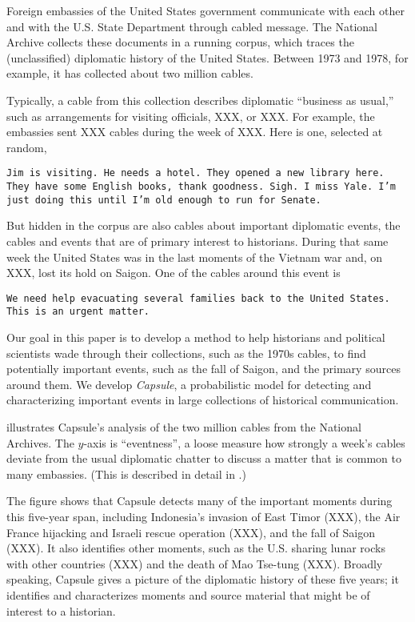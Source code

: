 

Foreign embassies of the United States government communicate with
each other and with the U.S. State Department through cabled message.
The National Archive collects these documents in a running corpus,
which traces the (unclassified) diplomatic history of the United
States. Between 1973 and 1978, for example, it has collected about two
million cables.

Typically, a cable from this collection describes diplomatic ``business as usual,'' such as arrangements for visiting officials, XXX, or XXX. For example,
the embassies sent XXX cables during the week of XXX. Here is one,
selected at random,
\begin{shaded*} {\tt Jim is visiting. He needs a hotel. They opened a
    new library
  here. They have some English books, thank goodness. Sigh. I miss
  Yale. I'm just doing this until I'm old enough to run for Senate.}
\end{shaded*}

But hidden in the corpus are also cables about important diplomatic
events, the cables and events that are of primary interest to
historians. During that same week the United States was in the last
moments of the Vietnam war and, on XXX, lost its hold on Saigon. One
of the cables around this event is
\begin{shaded*}
  {\tt We need help evacuating several families back to the United States.
  This is an urgent matter.}
\end{shaded*}

Our goal in this paper is to develop a method to help historians and
political scientists wade through their collections, such as the 1970s
cables, to find potentially important events, such as the fall of
Saigon, and the primary sources around them. We develop
\textit{Capsule}, a probabilistic model for detecting and
characterizing important events in large collections of historical
communication.

 illustrates Capsule's analysis of the two
million cables from the National Archives. The $y$-axis is
``eventness'', a loose measure how strongly a week's cables deviate
from the usual diplomatic chatter to discuss a matter that is common
to many embassies. (This is described in detail in \Cref{}.)

The figure shows that Capsule detects many of the important moments
during this five-year span, including Indonesia's invasion of East
Timor (XXX), the Air France hijacking and Israeli rescue operation
(XXX), and the fall of Saigon (XXX). It also identifies other moments,
such as the U.S. sharing lunar rocks with other countries (XXX) and
the death of Mao Tse-tung (XXX). Broadly speaking, Capsule gives a
picture of the diplomatic history of these five years; it identifies
and characterizes moments and source material that might be of
interest to a historian.

